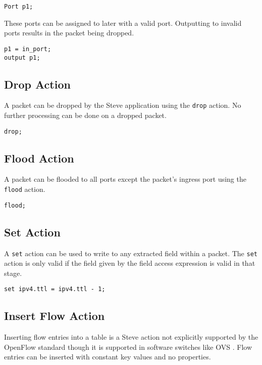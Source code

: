 \begin{lstlisting}
Port p1;
\end{lstlisting}

These ports can be assigned to later with a valid port. Outputting to invalid ports results in the packet being dropped.

\begin{lstlisting}
p1 = in_port;
output p1;
\end{lstlisting}

\subsection{Drop Action} \label{drop_action_tut}

A packet can be dropped by the Steve application using the \texttt{drop} action. No further processing can be done on a dropped packet.

\begin{lstlisting}
drop;
\end{lstlisting}

\subsection{Flood Action} \label{flood_action_tut}

A packet can be flooded to all ports except the packet's ingress port using the \texttt{flood} action.

\begin{lstlisting}
flood;
\end{lstlisting}

\subsection{Set Action} \label{set_action_tut}

A \texttt{set} action can be used to write to any extracted field within a packet. The \texttt{set} action is only valid if the field given by the field access expression is valid in that stage.

\begin{lstlisting}
set ipv4.ttl = ipv4.ttl - 1;
\end{lstlisting}

\subsection{Insert Flow Action} \label{insert_flow_action_tut}

Inserting flow entries into a table is a Steve action not explicitly supported by the OpenFlow standard \cite{openflow_spec} though it is supported in software switches like OVS \cite{ovs_man_page}. Flow entries can be inserted with constant key values and no properties. 

